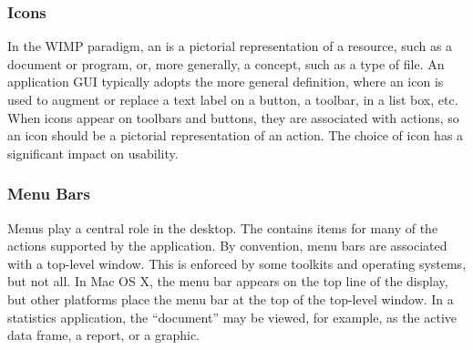 
\subsubsection{Icons}
\label{sec:GUI:icons}

In the WIMP paradigm, an  is a pictorial representation of a
resource, such as a document or program, or, more generally, a
concept, such as a type of file. An application GUI typically adopts
the more general definition, where an icon is used to augment or
replace a text label on a button, a toolbar, in a list box, etc. When
icons appear on toolbars and buttons, they are associated with
actions, so an icon should be a pictorial representation of an
action. The choice of icon has a significant impact on usability.



\subsubsection{Menu Bars}
\label{sec:GUI:menubars}

Menus play a central role in the  desktop. The  contains items for many of the actions supported by the
application.  By convention, menu bars are associated with a top-level
window. This is enforced by some toolkits and operating systems, but
not all. In Mac OS X, the menu bar appears on the top line of the
display, but other platforms place the menu bar at the top of the
top-level window. In a statistics application, the ``document'' may be
viewed, for example, as the active data frame, a report, or a graphic.

